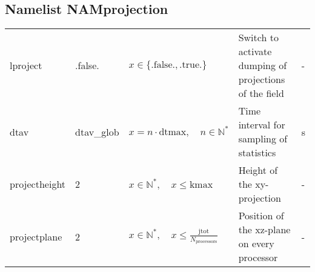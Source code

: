 \documentclass[twoside,11pt,fleqn,a4paper,english,openright]{report}
\begin{document}
\subsection{Namelist NAMprojection}\label{par:projection}
\begin{center}
  \tablelasttail{
        &&&&\\\hline
  }
\begin{supertabular}{|l|p{1.6cm}|p{4cm}|p{6cm}|l|}
  lproject	&	.false.	& $x\in\{\text{.false.},\text{.true.}\}$	& Switch to activate dumping of projections of the field	& -\\
  dtav		& dtav\_glob	& $x = n \cdot \text{dtmax}, \quad n \in \mathbb{N}^*$	& Time interval for sampling of statistics	& s\\
  projectheight	& 2	& $x \in \mathbb{N}^*, \quad x \le \text{kmax}$	& Height of the xy-projection & -\\
  projectplane	& 2	& $x \in \mathbb{N}^*, \quad x \le \frac{\text{jtot}}{N_{\text{processors}}}$	& Position of the xz-plane on every processor & -\\
\end{supertabular}
\end{center}

\end{document}
